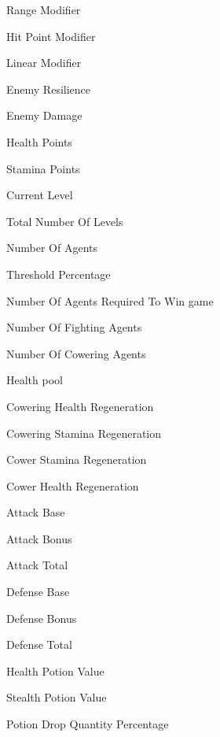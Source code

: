 \documentclass[a4paper,11pt]{report}
\begin{document}
\begin{description}

\item[\parbox{1.25 in}{$\delta$}] Range Modifier
\item[\parbox{1.25 in}{$\gamma$}] Hit Point Modifier 
\item[\parbox{1.25 in}{$\sigma$}] Linear Modifier
\item[\parbox{1.25 in}{$X$}] Enemy Resilience 
\item[\parbox{1.25 in}{$Y$}] Enemy Damage
\item[\parbox{1.25 in}{$HP$}] Health Points
\item[\parbox{1.25 in}{$ST$}] Stamina Points
\item[\parbox{1.25 in}{$c$}] Current Level
\item[\parbox{1.25 in}{$L$}] Total Number Of Levels
\item[\parbox{1.25 in}{$N$}] Number Of Agents  
\item[\parbox{1.25 in}{$\mu$}] Threshold Percentage 
\item[\parbox{1.25 in}{$M$}] Number Of Agents Required To Win game
\item[\parbox{1.25 in}{$N_f$}] Number Of Fighting Agents 
\item[\parbox{1.25 in}{$N_c$}] Number Of Cowering Agents 
\item[\parbox{1.25 in}{$HP_{pool}$}] Health pool
\item[\parbox{1.25 in}{$HP_c$}] Cowering Health Regeneration
\item[\parbox{1.25 in}{$ST_c$}] Cowering Stamina Regeneration
\item[\parbox{1.25 in}{$ST_{cower}$}] Cower Stamina Regeneration
\item[\parbox{1.25 in}{$HP_{cower}$}] Cower Health Regeneration   
\item[\parbox{1.25 in}{$A_s$}] Attack Base 
\item[\parbox{1.25 in}{$A_b$}] Attack Bonus
\item[\parbox{1.25 in}{$A$}] Attack Total  
\item[\parbox{1.25 in}{$D_s$}] Defense Base   
\item[\parbox{1.25 in}{$D_b$}] Defense Bonus
\item[\parbox{1.25 in}{$D$}] Defense Total
\item[\parbox{1.25 in}{$P_hp$}] Health Potion Value
\item[\parbox{1.25 in}{$P_st$}] Stealth Potion Value 
\item[\parbox{1.25 in}{$P$}] Potion Drop Quantity Percentage

\end{description}
\end{document}
